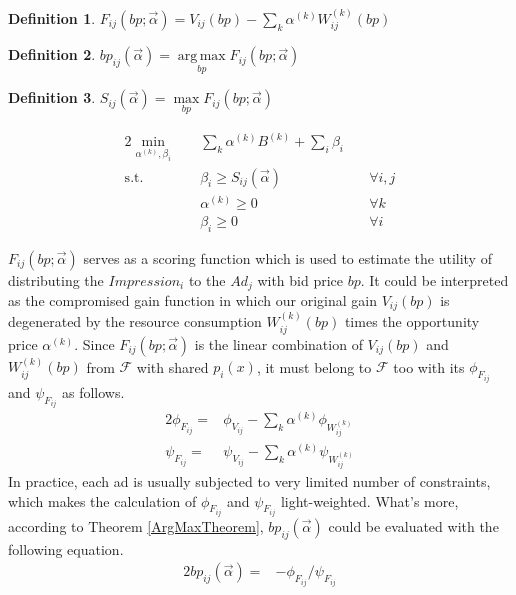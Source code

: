 \documentclass{article}
\DeclareMathOperator*{\argmax}{arg\,max}
\newtheorem{definition}{Definition}[section]
\newcommand{\sumi}{\sum\limits_i}
\newcommand{\sumk}{\sum\limits_k}
\newcommand{\sbp}{bp_{ij}}
\newcommand{\sV}{V_{ij}}
\newcommand{\sW}{W_{ij}^{(k)}}
\newcommand{\sB}{B^{(k)}}
\newcommand{\salpha}{\alpha^{(k)}}
\newcommand{\sbeta}{\beta_i}
\newcommand{\sF}{F_{ij}}
\newcommand{\sS}{S_{ij}}
\newcommand{\valpha}{\vec{\alpha}}
\newcommand{\pprob}{\phi}
\newcommand{\pcost}{\psi}
\newcommand{\uff}{\mathscr{F}}
\newcommand{\scoreconstraint}{\sbeta \ge \sS(\vec{\alpha})}
\begin{document}
\begin{definition}
$\sF(bp; \valpha) = \sV(bp) - \sumk \salpha \sW(bp)$
\end{definition}

\begin{definition}
$\sbp(\valpha) = \argmax\limits_{bp} \sF(bp; \valpha)$
\end{definition}

\begin{definition}
$\sS(\valpha) = \max\limits_{bp} \sF(bp; \valpha)$
\end{definition}

\begin{alignat}{2}
    \min\limits_{\salpha, \sbeta} \quad & \sumk \salpha \sB + \sumi \sbeta \quad & {} \\
    \mbox{s.t.} \quad                   & \scoreconstraint \quad                 & \forall i,j \\
    \quad                               & \salpha \ge 0 \quad                    & \forall k \\
    \quad                               & \sbeta \ge 0 \quad                     & \forall i
\end{alignat}

$\sF(bp; \valpha)$ serves as a scoring function which is used to estimate
    the utility of distributing the $Impression_i$ to the $Ad_j$ with bid price $bp$.
It could be interpreted as the compromised gain function in which
    our original gain $\sV(bp)$ is degenerated by the resource consumption $\sW(bp)$ times the opportunity price $\salpha$.
Since $\sF(bp; \valpha)$ is the linear combination of $\sV(bp)$ and $\sW(bp)$ from $\uff$ with shared $p_i(x)$,
    it must belong to $\uff$ too with its $\pprob_{\sF}$ and $\pcost_{\sF}$ as follows.
\begin{alignat}{2}
\pprob_{\sF}= & \pprob_{\sV} - \sum\limits_k \salpha \pprob_{\sW} \\
\pcost_{\sF}= & \pcost_{\sV} - \sum\limits_k \salpha \pcost_{\sW}
\end{alignat}
In practice, each ad is usually subjected to very limited number of constraints,
    which makes the calculation of $\pprob_{\sF}$ and $\pcost_{\sF}$ light-weighted.
What's more, according to Theorem \ref{ArgMaxTheorem}, $\sbp(\valpha)$ could be evaluated with the following equation.
\begin{alignat}{2}
\sbp(\valpha)= & - \pprob_{\sF} / \pcost_{\sF}
\end{alignat}
\end{document}
